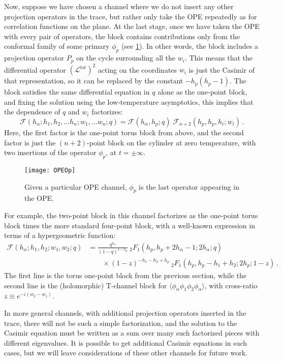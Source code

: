 \documentclass[12pt]{article}
\newcommand{\calL}{\mathcal{L}}
\begin{document}
Now, suppose we have chosen a channel where we do not insert any other projection operators in the trace, but rather only take the OPE repeatedly as for correlation functions on the plane. At the last stage, once we have taken the OPE with every pair of operators, the block contains contributions only from the conformal family of some primary $\phi_p$  (see \cref{fig:Op}). In other words, the block includes a projection operator $P_p$ on the cycle surrounding all the $w_i$. This means that the differential operator $\left(\calL^{tot}\right)^2$ acting on the coordinates $w_i$ is just the Casimir of that representation, so it can be replaced by the constant $-h_p(h_p-1)$. The block satisfies the same differential equation in $q$ alone as the one-point block, and fixing the solution using the low-temperature asymptotics, this implies that the dependence of $q$ and $w_i$ factorizes:
\begin{equation}
\mathcal{F}(h_{\alpha};h_1,h_2,\ldots h_n;w_1,\ldots w_n;q) = \mathcal{F}(h_{\alpha},h_p;q)\; \mathcal{F}_{n+2}(h_p,h_p,h_i;w_i)~.
\end{equation}
Here, the first factor is the one-point torus block from above, and the second factor is just the $(n+2)$-point block on the cylinder at zero temperature, with two insertions of the operator $\phi_p$, at $t=\pm\infty$.

  \begin{figure}[h!]
 \centering
  \texttt{[image: OPEOp]}
 \caption{
Given a particular OPE channel, $\phi_p$ is the last operator appearing in the OPE.
 \label{fig:Op}
}
 \end{figure}

For example, the two-point block in this channel factorizes as the one-point torus block times the more standard four-point block, with a well-known expression in terms of a hypergeometric function:
\begin{align}\label{eq:twopointblock1}
	\mathcal{F}(h_\alpha;h_1,h_2;w_1,w_2;q)&= \frac{q^{h_\alpha}}{(1-q)^{1-h_p}} \: {}_2F_1(h_p,h_p+2h_\alpha-1;2h_\alpha;q)  \nonumber\\
	&  \qquad \times (1-z)^{-h_1-h_2+h_p} \: _2F_1\left(h_p,h_p-h_1+h_2;2 h_p;1-z\right) \,.
\end{align}
The first line is the torus one-point block from the previous section, while the second line is the (holomorphic) T-channel block for $\langle \phi_\alpha \phi_1\phi_2 \phi_\alpha\rangle$, with cross-ratio $z\equiv e^{-i (w_2-w_1)}$.

In more general channels, with additional projection operators inserted in the trace, there will not be such a simple factorization, and the solution to the Casimir equation must be written as a sum over many such factorized pieces with different eigenvalues. It is possible to get additional Casimir equations in such cases, but we will leave considerations of these other channels for future work.
\end{document}
